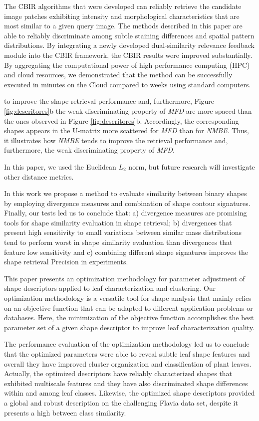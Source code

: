 {The CBIR algorithms that were developed can reliably retrieve the candidate image patches exhibiting intensity and morphological characteristics that are most similar to a given query image. The methods described in this paper are able to reliably discriminate among subtle staining differences and spatial pattern distributions. By integrating a newly developed dual-similarity relevance feedback module into the CBIR framework, the CBIR results were improved substantially. By aggregating the computational power of high performance computing (HPC) and cloud resources, we demonstrated that the method can be successfully executed in minutes on the Cloud compared to weeks using standard computers. 

to improve the shape retrieval performance and, furthermore, Figure \ref{fig:descritores}b the weak discriminating property of \emph{MFD}
are more spaced than the ones observed in Figure \ref{fig:descritores}b. Accordingly, the corresponding shapes appears in the U-matrix more scattered for \emph{MFD} than for \emph{NMBE}. Thus, it illustrates how \emph{NMBE} tends to improve the retrieval performance and, furthermore, the weak discriminating property of \emph{MFD}.


In this paper, we used the Euclidean $L_2$ norm, but future research will investigate other distance metrics. 

In this work we propose a method to evaluate similarity between binary shapes by employing divergence measures and combination of shape contour signatures. Finally, our tests led us to conclude that:  a) divergence measures are promising tools for shape similarity evaluation in shape retrieval; b) divergences that present high sensitivity to small variations between similar mass distributions tend to perform worst in shape similarity evaluation than divergences that feature low sensitivity and c) combining different shape signatures improves the shape retrieval Precision in experiments. 

This paper presents an optimization methodology for parameter adjustment of shape descriptors applied to leaf characterization and clustering. Our optimization methodology is a versatile tool for shape analysis that mainly relies on an objective function that can be adapted to different application problems or databases. Here, the minimization of the objective function accomplishes the best parameter set of a given shape descriptor to improve leaf characterization quality. 

The performance evaluation of the optimization methodology led us to conclude that the optimized parameters were able to reveal subtle leaf shape features and overall they have improved cluster organization and classification of plant leaves.
Actually, the optimized descriptors have reliably characterized shapes that exhibited multiscale features and they have also discriminated shape differences within and among leaf classes.
Likewise, the optimized shape descriptors provided a global and robust description on the challenging Flavia data set,  despite it presents a high between class similarity.

}
